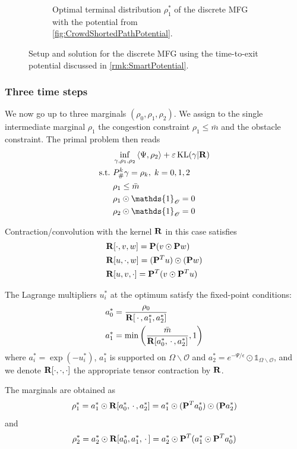 \documentclass[../report.tex]{subfiles}
\begin{document}
\begin{figure}
\begin{subfigure}[t]{.4\linewidth}
		\caption{Optimal terminal distribution $\rho^*_1$ of the discrete MFG with the potential from \cref{fig:CrowdShortedPathPotential}.}\label{fig:2MargEikonalGame}
	\end{subfigure}
	\caption{Setup and solution for the discrete MFG using the time-to-exit potential discussed in \cref{rmk:SmartPotential}.}
\end{figure}

\subsubsection{Three time steps}

We now go up to three marginals $(\rho_0,\rho_1,\rho_2)$. We assign to the single intermediate marginal $\rho_1$ the congestion constraint $\rho_1 \leq \bar{m}$ and the obstacle constraint. The primal problem then reads
\begin{equation}
\begin{aligned}
	&\inf_{\gamma,\rho_1,\rho_2}{} \langle \Psi, \rho_2\rangle + \epsilon \KL(\gamma | \bfR) \\
	\suchthat \ & P^k_\#\gamma = \rho_k,\; k = 0,1,2 \\
	& \rho_1 \leq \bar{m} \\
	& \rho_1\odot\mathds{1}_{\mathscr O} = 0\\
	& \rho_2\odot\mathds{1}_{\mathscr O} = 0
\end{aligned}
\end{equation}

Contraction/convolution with the kernel $\mathbf{R}$ in this case satisfies
\[
\begin{aligned}
	&\mathbf{R}[\cdot,v,w] = 
	\mathbf{P} (v \odot \mathbf{P}w) \\
	&\mathbf{R}[u,\cdot,w]
	= (\mathbf{P}^Tu) \odot (\mathbf{P}w)  \\
	&\mathbf{R}[u, v, \cdot] = 
	\mathbf{P}^T (v \odot \mathbf{P}^T u)
\end{aligned}
\]

\begin{prop}
The Lagrange multipliers $u_i^*$ at the optimum satisfy the fixed-point conditions:
\begin{align*}
	&a_0^* = \frac{\rho_0}{\mathbf{R}[\,\cdot\,, a_1^*, a_2^*]} \\
	&a_1^* = \min\left(
	\frac{\bar{m}}{\mathbf{R}[a_0^*, \,\cdot\,, a_2^*]}, 1\right)
\end{align*}
where $a_i^* = \exp(-u_i^*)$, $a_1^*$ is supported on $\Omega\backslash\mathscr{O}$ and $a_2^* = e^{-\Psi/\epsilon}\odot\mathds{1}_{\Omega\backslash\mathscr{O}}$, and we denote $\mathbf{R}[\cdot,\cdot,\cdot]$ the appropriate tensor contraction by $\mathbf{R}$.

The marginals are obtained as
\[
	\rho_1^* =
	a_1^* \odot
	\mathbf{R}[a_0^*, \,\cdot\,, a_2^*] =
	a_1^* \odot
	(\mathbf{P}^Ta_0^*) \odot
	(\mathbf{P}a_2^*)
\]
and
\[
	\rho_2^* = 
	a_2^* \odot \mathbf{R}[a_0^*, a_1^*, \,\cdot\,]
	= a_2^* \odot
	\mathbf{P}^T
	(a_1^* \odot \mathbf{P}^Ta_0^*)
\]
\end{prop}
\end{document}
